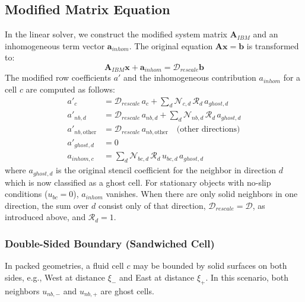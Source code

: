 \documentclass[preprint,12pt]{elsarticle}
\begin{document}
\subsection{Modified Matrix Equation}
In the linear solver, we construct the modified system matrix $\mathbf{A}_{IBM}$ and an inhomogeneous term vector $\mathbf{a}_{inhom}$. The original equation $\mathbf{A} \mathbf{x} = \mathbf{b}$ is transformed to:
\begin{equation}
    \mathbf{A}_{IBM} \mathbf{x} + \mathbf{a}_{inhom} = \mathcal{D}_{rescale} \mathbf{b}
\end{equation}
The modified row coefficients $a'$ and the inhomogeneous contribution $a_{inhom}$ for a cell $c$ are computed as follows:
\begin{equation}
    \begin{aligned}
    a'_c &= \mathcal{D}_{rescale} \, a_c + \sum_d \mathcal{N}_{c,d} \, \mathcal{R}_d \, a_{ghost,d}\\
    a'_{nb,d} &= \mathcal{D}_{rescale} \, a_{nb,d} + \sum_d \mathcal{N}_{nb,d}  \, \mathcal{R}_d \, a_{ghost,d} \\
    a'_{nb,\mathrm{other}} &= \mathcal{D}_{rescale} \, a_{nb,\mathrm{other}} \quad \text{(other directions)} \\
    a'_{ghost,d} &= 0 \\
    a_{inhom,c} &= \sum_d \mathcal{N}_{bc,d} \, \mathcal{R}_d \, u_{bc,d} \, a_{ghost,d}
    \end{aligned}
\end{equation}
where $a_{ghost,d}$ is the original stencil coefficient for the neighbor in direction $d$ which is now classified as a ghost cell. For stationary objects with no-slip conditions ($u_{bc}=0$), $a_{inhom}$ vanishes.
When there are only solid neighbors in one direction, the sum over $d$ consist only of that direction, $\mathcal{D}_{rescale} = \mathcal{D}$, as introduced above, and $\mathcal{R}_d =1$.

\subsubsection{Double-Sided Boundary (Sandwiched Cell)}
In packed geometries, a fluid cell $c$ may be bounded by solid surfaces on both sides, e.g., West at distance $\xi_-$ and East at distance $\xi_+$. In this scenario, both neighbors $u_{nb,-}$ and $u_{nb,+}$ are ghost cells.
\end{document}

